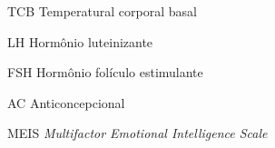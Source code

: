 \begin{siglas}
  \item[TCB] Temperatural corporal basal
  \item[LH] Hormônio luteinizante
  \item[FSH] Hormônio folículo estimulante
  \item[AC] Anticoncepcional
  \item[MEIS] \textit{Multifactor Emotional Intelligence Scale}
\end{siglas}
